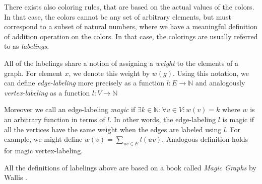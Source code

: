 There exists also coloring rules, that are based on the actual values of the colors. In that case, the colors cannot be any set of arbitrary elements, but must correspond to a subset of natural numbers, where we have a meaningful definition of addition operation on the colors. In that case, the colorings are usually referred to as \textit{labelings}.

All of the labelings share a notion of assigning a \textit{weight} to the elements of a graph. For element $x$, we denote this weight by $w(g)$. Using this notation, we can define \textit{edge-labeling} more precisely as a function $l:E \rightarrow \mathbb{N}$ and analogously \textit{vertex-labeling} as a function $l:V \rightarrow \mathbb{N}$

Moreover we call an edge-labeling \textit{magic} if $\exists k \in \mathbb{N} : \forall v \in V:w(v) = k$ where $w$ is an arbitrary function in terms of $l$. In other words, the edge-labeling $l$ is magic if all the vertices have the same weight when the edges are labeled using $l$. For example, we might define $w(v) = \sum_{uv \in E}l(uv)$. Analogous definition holds for magic vertex-labeling.

All the definitions of labelings above are based on a book called \textit{Magic Graphs} by Wallis \cite{marrwall2013}.
